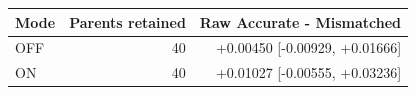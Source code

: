 \begin{tabular}{lrr}
\toprule
Mode & Parents retained & Raw Accurate - Mismatched \\
\midrule
OFF & 40 & +0.00450 [-0.00929, +0.01666] \\
ON & 40 & +0.01027 [-0.00555, +0.03236] \\
\bottomrule
\end{tabular}
